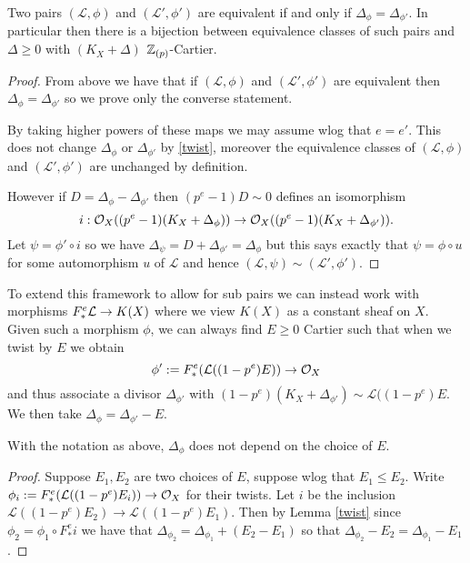 \begin{lemma}
	
	Two pairs $(\mathcal{L}, \phi)$ and $(\mathcal{L}', \phi')$ are equivalent if and only if $\Delta_{\phi}=\Delta_{\phi'}$. In particular then there is a bijection between equivalence classes of such pairs and $\Delta \geq 0$ with $(K_{X}+\Delta)$ $\mathbb{Z}_{(p)}$-Cartier.
	
	
	\end{lemma}

\begin{proof}
	
	From above we have that if $(\mathcal{L}, \phi)$ and $(\mathcal{L}', \phi')$ are equivalent then $\Delta_{\phi} = \Delta_{\phi'}$ so we prove only the converse statement.
	
	By taking higher powers of these maps we may assume wlog that $e=e'$. This does not change $\Delta_{\phi}$ or $\Delta_{\phi'}$ by \autoref{twist}, moreover the equivalence classes of $(\mathcal{L}, \phi)$ and $(\mathcal{L}', \phi')$ are unchanged by definition.
	
	However if $D=\Delta_{\phi}-\Delta_{\phi'}$ then $(p^{e}-1)D \sim 0$ defines an isomorphism $$i:\mathcal{O}_{X}((p^{e}-1)(K_{X}+\Delta_{\phi}))\to \mathcal{O}_{X} ((p^{e}-1)(K_{X}+\Delta_{\phi'})).$$ Let $\psi=\phi' \circ i$ so we have $\Delta_{\psi}=D+\Delta_{\phi'}=\Delta_{\phi}$ but this says exactly that $\psi=\phi\circ u$ for some automorphism $u$ of $\mathcal{L}$ and hence $(\mathcal{L},\psi)\sim(\mathcal{L'},\phi')$. 
	
\end{proof}

To extend this framework to allow for sub pairs we can instead work with morphisms $F^{e}_{*}\mathcal{L} \to K(X)$ where we view $K(X)$ as a constant sheaf on $X$. Given such a morphism $\phi$, we can always find $E \geq 0$ Cartier such that when we twist by $E$ we obtain $$\phi':=F^{e}_{*}(\mathcal{L}((1-p^{e})E)) \to \mathcal{O}_{X}$$ and thus associate a divisor $\Delta_{\phi'}$ with $(1-p^{e})(K_{X}+\Delta_{\phi'})\sim \mathcal{L}((1-p^{e})E$. We then take $\Delta_{\phi}=\Delta_{\phi'}-E$.

\begin{lemma}
	With the notation as above, $\Delta_{\phi}$ does not depend on the choice of $E$.
\end{lemma}
\begin{proof}
	Suppose $E_{1},E_{2}$ are two choices of $E$, suppose wlog that $E_{1} \leq E_{2}$. Write $\phi_{i}:=F^{e}_{*}(\mathcal{L}((1-p^{e})E_{i})) \to \mathcal{O}_{X}$ for their twists. Let $i$ be the inclusion $\mathcal{L}((1-p^{e})E_{2}) \to\mathcal{L}((1-p^{e})E_{1})$. Then by Lemma \ref{twist} since $\phi_{2}=\phi_{1}\circ F_{*}^{e}i$ we have that $\Delta_{\phi_{2}}=\Delta_{\phi_{1}}+(E_{2}-E_{1})$ so that $\Delta_{\phi_{2}}-E_{2}=\Delta_{\phi_{1}}-E_{1}$.
\end{proof}


